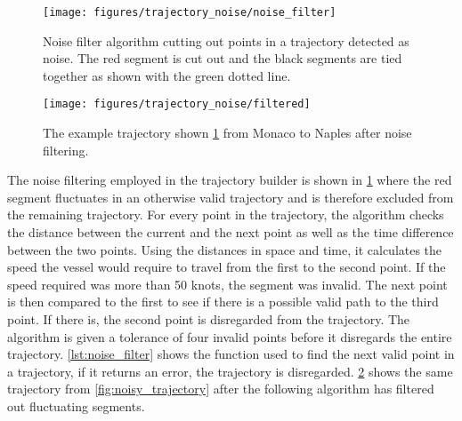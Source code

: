\begin{figure}[htbp]  %
    \centering
    \texttt{[image: figures/trajectory\_noise/noise\_filter]}
    \caption{Noise filter algorithm cutting out points in a trajectory detected as noise. The red segment is cut out and the black segments are tied together as shown with the green dotted line.}
    \label{fig:noise_filter}
\end{figure}

\begin{figure}[htbp]  %
    \centering
    \texttt{[image: figures/trajectory\_noise/filtered]}
    \caption{The example trajectory shown \cref{fig:noise_filter} from Monaco to Naples after noise filtering.}
    \label{fig:noise_filtered}
\end{figure}

The noise filtering employed in the trajectory builder is shown in \cref{fig:noise_filter} where the red segment fluctuates in an otherwise valid trajectory and is therefore excluded from the remaining trajectory. For every point in the trajectory, the algorithm checks the distance between the current and the next point as well as the time difference between the two points. Using the distances in space and time, it calculates the speed the vessel would require to travel from the first to the second point. If the speed required was more than 50 knots, the segment was invalid. The next point is then compared to the first to see if there is a possible valid path to the third point. If there is, the second point is disregarded from the trajectory. The algorithm is given a tolerance of four invalid points before it disregards the entire trajectory. \cref{lst:noise_filter} shows the function used to find the next valid point in a trajectory, if it returns an error, the trajectory is disregarded. \cref{fig:noise_filtered} shows the same trajectory from \cref{fig:noisy_trajectory} after the following algorithm has filtered out fluctuating segments.

